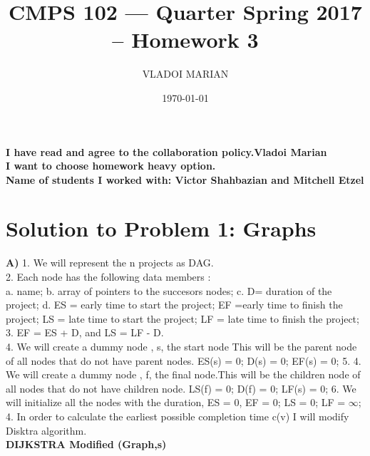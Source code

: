 \documentclass[10 pt]{article}
\title{ CMPS 102 --- Quarter  Spring 2017 --  Homework 3}
\author{VLADOI MARIAN}
\date{\today}
\begin{document}
\maketitle

\begin{center}
{\bf I have read and agree to the collaboration policy.Vladoi Marian}\\
{\bf I want to choose homework heavy option.}\\
{\bf Name of students I worked with: Victor Shahbazian and Mitchell Etzel }
\end{center}


\section*{Solution to Problem 1: Graphs}
 
\textbf{A)}
1. We will represent the n projects as DAG.\\ 
2. Each node has the following data members :\\ 
a. name;  b. array of pointers to the succesors nodes; c. D= duration of the project; d. ES = early time to start the project; EF =early time to finish the project; LS = late time to start the project; LF = late time to finish the project;\\ 
3. EF = ES + D, and LS = LF - D.\\
4. We will create a dummy node , s, the start node This will be the parent node of all nodes that do not have parent nodes. ES(s) = 0; D(s) = 0; EF(s) = 0; 
5. 4. We will create a dummy node , f, the final node.This will be the children node of all nodes that do not have children node. LS(f) = 0; D(f) = 0; LF(s) = 0;
6. We will initialize all the nodes with the duration, ES = 0, EF = 0; LS = 0; LF = $\infty$;
4. In order to calculate the  earliest possible completion time c(v) I will modify Disktra algorithm.\\ 


\textbf{ DIJKSTRA Modified  (Graph,s)}
\end{document}

